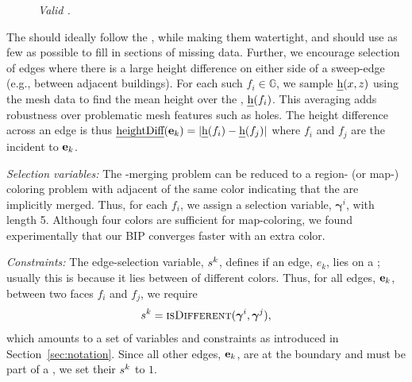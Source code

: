 \begin{figure}[b!]
    \centering
  \def\svgwidth{0.8\columnwidth}  
    
  \caption{\textit{Valid \footprintpolygons.} }
  \label{fig:valid}
\end{figure}

%
%
%

The \footprintpolygons should ideally follow the \sweepedges, while making them watertight, and should use as few \softedges as possible to fill in sections of missing data. Further, we  encourage selection of edges where there is a large height difference on either side of a sweep-edge \neu{} (e.g., between adjacent buildings). 
%
For each such \face $f_i \in \mathbb{G}$, we sample $\text{\emph{h}}{}(x,z)$ using the mesh data to find the mean height over the \face, $\text{\emph{h}}{}(f_i)$. This averaging adds robustness over problematic mesh features such as holes. The height difference across an edge is thus $\text{\emph{heightDiff}}(\mathbf{e}_k)  = |\text{\emph{h}}(f_i)-\text{\emph{h}}(f_j)|$  where $f_i$ and $f_j$ are the \faces incident to $\mathbf{e}_k$.


\pagebreak

{\noindent \em Selection variables:} %
The \face-merging problem can be reduced to a region- (or map-) coloring problem with adjacent \faces of the same color indicating that the \faces are implicitly merged. 
Thus, for each $f_i$, we assign a selection variable, $\mathbold{\gamma}^i$, with length 5. Although four colors are sufficient for map-coloring, we found experimentally that our BIP converges faster with an extra color.


{\noindent \em Constraints:} 
The edge-selection variable, $s^k$, defines if an edge, $e_k$, lies on a \footprintpolygon; usually this is because it lies between \faces of different colors.
% 
Thus, for all edges, $\mathbf{e}_{k}$, between two faces $f_i$ and $f_j$, we require
\begin{equation*}
\isEdge^k = \isDifferent{\mathbold{\gamma}^i,\mathbold{\gamma}^j},    
\end{equation*}
which amounts to a set of variables and constraints as introduced in Section~\ref{sec:notation}.
%
Since all other edges, $\mathbf{e}_k$, are at the boundary and must be part of a \footprintpolygon, we set their
$s^k$ to $1$. 



